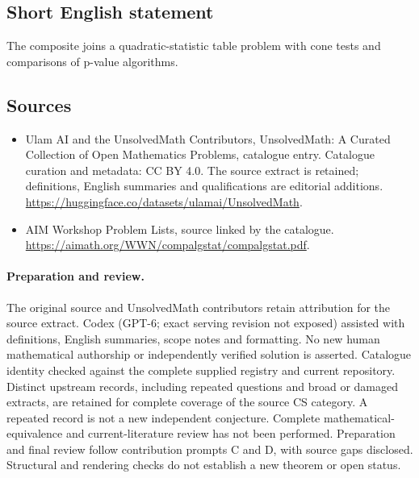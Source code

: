 \documentclass[11pt]{article}
\begin{document}
\subsection{Short English statement}
The composite joins a quadratic-statistic table problem with cone tests and comparisons of p-value algorithms.
\subsection{Sources}
\begin{itemize}
\item[\hypertarget{source:statement:1}{S1}] Ulam AI and the UnsolvedMath Contributors, UnsolvedMath: A Curated Collection of Open Mathematics Problems, catalogue entry. Catalogue curation and metadata: CC BY 4.0. The source extract is retained; definitions, English summaries and qualifications are editorial additions.
\url{https://huggingface.co/datasets/ulamai/UnsolvedMath}.
\item[\hypertarget{source:statement:2}{S2}] AIM Workshop Problem Lists, source linked by the catalogue.
\url{https://aimath.org/WWN/compalgstat/compalgstat.pdf}.
\end{itemize}
\paragraph{Preparation and review.}
The original source and UnsolvedMath contributors retain attribution for the source extract. Codex (GPT-6; exact serving revision not exposed) assisted with definitions, English summaries, scope notes and formatting. No new human mathematical authorship or independently verified solution is asserted. Catalogue identity checked against the complete supplied registry and current repository. Distinct upstream records, including repeated questions and broad or damaged extracts, are retained for complete coverage of the source CS category. A repeated record is not a new independent conjecture. Complete mathematical-equivalence and current-literature review has not been performed. Preparation and final review follow contribution prompts C and D, with source gaps disclosed. Structural and rendering checks do not establish a new theorem or open status.
\label{end:statement}
\end{document}

